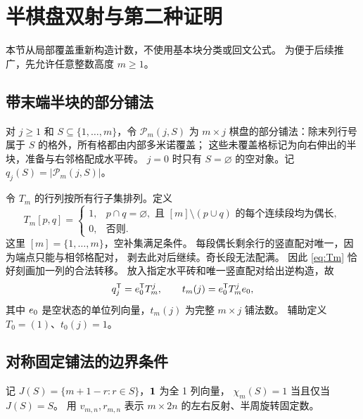 \section{半棋盘双射与第二种证明}\label{sec:half}
本节从局部覆盖重新构造计数，不使用基本块分类或回文公式。
为便于后续推广，先允许任意整数高度 $m\ge1$。

\subsection{带末端半块的部分铺法}
对 $j\ge1$ 和 $S\subseteq\{1,\ldots,m\}$，令 $\mathcal P_m(j,S)$ 为
$m\times j$ 棋盘的部分铺法：除末列行号属于 $S$ 的格外，所有格都由内部多米诺覆盖；
这些未覆盖格标记为向右伸出的半块，准备与右邻格配成水平砖。
$j=0$ 时只有 $S=\varnothing$ 的空对象。记 $q_j(S)=|\mathcal P_m(j,S)|$。

令 $T_m$ 的行列按所有行子集排列。定义
\begin{equation}\label{eq:Tm}
 T_m[p,q]=
 \begin{cases}
 1,&p\cap q=\varnothing,\text{ 且 }[m]\setminus(p\cup q)
       \text{ 的每个连续段均为偶长},\\
 0,&\text{否则}.
 \end{cases}
\end{equation}
这里 $[m]=\{1,\ldots,m\}$，空补集满足条件。
每段偶长剩余行的竖直配对唯一，因为端点只能与相邻格配对，
剥去此对后继续。奇长段无法配满。
因此 \eqref{eq:Tm} 恰好刻画加一列的合法转移。
放入指定水平砖和唯一竖直配对给出逆构造，故
\begin{equation}\label{eq:profile}
 q_j^{\mathsf T}=e_0^{\mathsf T}T_m^j,\qquad
 t_m(j)=e_0^{\mathsf T}T_m^je_0,
\end{equation}
其中 $e_0$ 是空状态的单位列向量，$t_m(j)$ 为完整 $m\times j$ 铺法数。
辅助定义 $T_0=(1)$、$t_0(j)=1$。

\subsection{对称固定铺法的边界条件}
记 $J(S)=\{m+1-r:r\in S\}$，$\boldsymbol{1}$ 为全 1 列向量，
$\chi_m(S)=1$ 当且仅当 $J(S)=S$。
用 $v_{m,n},r_{m,n}$ 表示 $m\times2n$ 的左右反射、半周旋转固定数。


